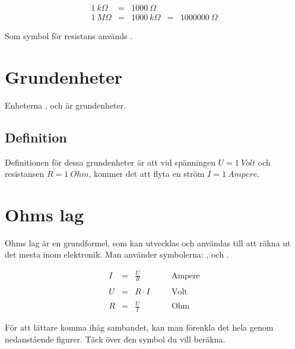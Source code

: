 \[
\begin{array}{rclcl}
\SI{1}{k\Omega} &=& \SI{1000}{\Omega} \\
\SI{1}{M\Omega} &=& \SI{1000}{k\Omega} &=& \SI{1000000}{\Omega}
\end{array}
\]

Som symbol för resistans används .

\section{Grundenheter}

Enheterna ,  och \enhet{\Omega} är grundenheter.

\subsection{Definition}

Definitionen för dessa grundenheter är att
vid spänningen $U = \SI{1}{Volt}$ och resistansen
$R = \SI{1}{Ohm}$, kommer det att flyta en ström
$I = \SI{1}{Ampere}$.


\section{Ohms lag}

Ohms lag är en grundformel, som kan
utvecklas och användas till att räkna ut det
mesta inom elektronik. Man använder symbolerna: ,  och .

\[
\begin{array}{rclcl}
  I &=& \frac{U}{R} &\quad& \text{Ampere} \\
  \\
  U &=& R \cdot I &\quad& \text{Volt} \\
  \\
  R &=& \frac{U}{I} &\quad& \text{Ohm}
\end{array}
\]

För att lättare komma ihåg sambandet, kan man förenkla det hela genom nedanstående
figurer. Täck över den symbol du vill beräkna.


